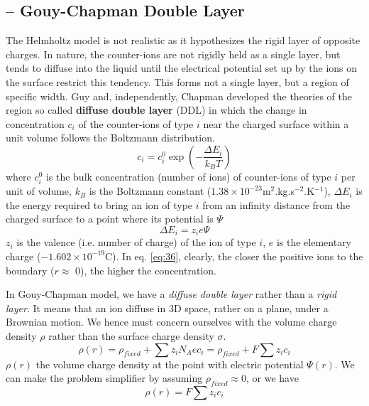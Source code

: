 \subsection{-- Gouy-Chapman Double Layer}
\label{sec:gouy-chapman-double}

The Helmholtz model is not realistic as it hypothesizes the rigid
layer of opposite charges. In nature, the counter-ions are not rigidly
held as a single layer, but tends to diffuse into the liquid until the
electrical potential set up by the ions on the surface restrict this
tendency. This forms not a single layer, but a region of specific
width. Guy and, independently, Chapman developed the theories of the
region so called {\bf diffuse double layer} (DDL) in which the change
in concentration $c_i$ of the counter-ions of type $i$ near the
charged surface within a unit volume follows the Boltzmann
distribution.
\begin{equation}
  \label{eq:36}
  c_i = c_i^0 \exp(-\frac{\Delta E_i}{k_BT})
\end{equation}
where $c_i^0$ is the bulk concentration (number of ions) of
counter-ions of type $i$ per unit of volume, $k_B$ is the Boltzmann
constant ($1.38\times 10^{-23}$m$^2$.kg.s$^{-2}$.K$^{-1}$), $\Delta E_i$ is
the energy required to bring an ion of type $i$ from an infinity
distance from the charged surface to a point where its potential is
$\Psi$
\begin{equation}
  \label{eq:40}
  \Delta E_i = z_ie\Psi
\end{equation}
$z_i$ is the valence (i.e. number of charge) of the ion of type $i$,
$e$ is the elementary charge ($-1.602\times 10^{-19}$C). In
eq. \eqref{eq:36}, clearly, the closer the positive ions to the
boundary ($r \approx$ 0), the higher the concentration.


In Gouy-Chapman model, we have a {\it diffuse double layer} rather
than a {\it rigid layer}. It means that an ion diffuse in 3D
space, rather on a plane, under a Brownian motion. We hence must concern
ourselves with the volume charge density $\rho$ rather than the
surface charge density $\sigma$.
\begin{equation}
  \label{eq:37}
  \rho(r) = \rho_{fixed} + \sum z_i N_Ae c_i =  \rho_{fixed} + F\sum z_i  c_i 
\end{equation}
$\rho(r)$ the volume charge density at the point with electric
potential $\Psi(r)$. We can make the problem simplifier by assuming
$\rho_{fixed} \approx 0$, or we have
\begin{equation}
  \label{eq:62}
  \rho(r) = F\sum z_i c_i
\end{equation}

